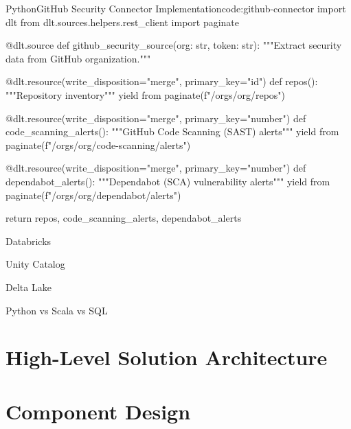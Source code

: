 \begin{code}{Python}{GitHub Security Connector Implementation}{code:github-connector}
import dlt
from dlt.sources.helpers.rest_client import paginate

@dlt.source
def github_security_source(org: str, token: str):
    """Extract security data from GitHub organization."""

    @dlt.resource(write_disposition="merge", primary_key="id")
    def repos():
        """Repository inventory"""
        yield from paginate(f"/orgs/{org}/repos")

    @dlt.resource(write_disposition="merge", primary_key="number")
    def code_scanning_alerts():
        """GitHub Code Scanning (SAST) alerts"""
        yield from paginate(f"/orgs/{org}/code-scanning/alerts")

    @dlt.resource(write_disposition="merge", primary_key="number")
    def dependabot_alerts():
        """Dependabot (SCA) vulnerability alerts"""
        yield from paginate(f"/orgs/{org}/dependabot/alerts")

    return repos, code_scanning_alerts, dependabot_alerts
\end{code}

Databricks

Unity Catalog

Delta Lake

Python vs Scala vs SQL


\section{High-Level Solution Architecture}


\section{Component Design}

